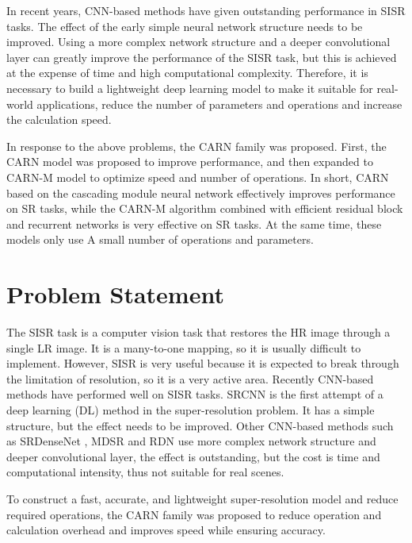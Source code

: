\documentclass[final]{cvpr}
\begin{document}
In recent years, CNN-based methods have given outstanding performance in SISR tasks. The effect of the early simple neural network structure needs to be improved. Using a more complex network structure and a deeper convolutional layer can greatly improve the performance of the SISR task, but this is achieved at the expense of time and high computational complexity. Therefore, it is necessary to build a lightweight deep learning model to make it suitable for real-world applications, reduce the number of parameters and operations and increase the calculation speed.


In response to the above problems, the CARN family was proposed. First, the CARN model was proposed to improve performance, and then expanded to CARN-M model to optimize speed and number of operations. In short, CARN based on the cascading module neural network effectively improves performance on SR tasks, while the CARN-M algorithm combined with efficient residual block and recurrent networks is very effective on SR tasks. At the same time, these models only use A small number of operations and parameters. 


\section{Problem Statement}

The SISR task is a computer vision task that restores the HR image through a single LR image. It is a many-to-one mapping, so it is usually difficult to implement. However, SISR is very useful because it is expected to break through the limitation of resolution, so it is a very active area. Recently CNN-based methods have performed well on SISR tasks. SRCNN is the first attempt of a deep learning (DL) method in the super-resolution problem. It has a simple structure, but the effect needs to be improved. Other CNN-based methods such as SRDenseNet \cite{r2}, MDSR \cite{r3} and RDN \cite{r4} use more complex network structure and deeper convolutional layer, the effect is outstanding, but the cost is time and computational intensity, thus not suitable for real scenes.

To construct a fast, accurate, and lightweight super-resolution model and reduce required operations, the CARN family was proposed to reduce operation and calculation overhead and improves speed while ensuring accuracy. 
\end{document}
